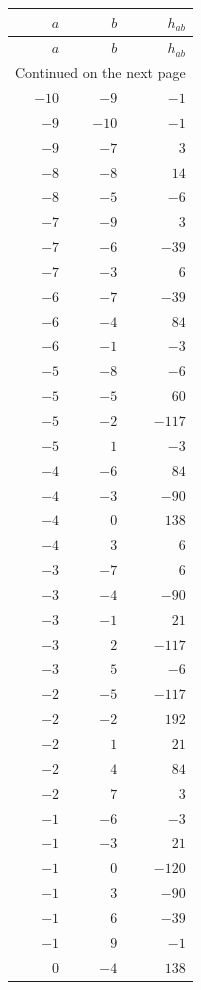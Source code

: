\begin{longtable}{rrr}
\toprule
$a$ & $b$ & $h_{ab}$ \\
\midrule
\endfirsthead
\toprule
$a$ & $b$ & $h_{ab}$ \\
\midrule
\endhead
\midrule
\multicolumn{3}{r}{Continued on the next page} \\
\endfoot
\bottomrule
\endlastfoot
$-10$ & $-9$ & $-1$ \\
$-9$ & $-10$ & $-1$ \\
$-9$ & $-7$ & $3$ \\
$-8$ & $-8$ & $14$ \\
$-8$ & $-5$ & $-6$ \\
$-7$ & $-9$ & $3$ \\
$-7$ & $-6$ & $-39$ \\
$-7$ & $-3$ & $6$ \\
$-6$ & $-7$ & $-39$ \\
$-6$ & $-4$ & $84$ \\
$-6$ & $-1$ & $-3$ \\
$-5$ & $-8$ & $-6$ \\
$-5$ & $-5$ & $60$ \\
$-5$ & $-2$ & $-117$ \\
$-5$ & $1$ & $-3$ \\
$-4$ & $-6$ & $84$ \\
$-4$ & $-3$ & $-90$ \\
$-4$ & $0$ & $138$ \\
$-4$ & $3$ & $6$ \\
$-3$ & $-7$ & $6$ \\
$-3$ & $-4$ & $-90$ \\
$-3$ & $-1$ & $21$ \\
$-3$ & $2$ & $-117$ \\
$-3$ & $5$ & $-6$ \\
$-2$ & $-5$ & $-117$ \\
$-2$ & $-2$ & $192$ \\
$-2$ & $1$ & $21$ \\
$-2$ & $4$ & $84$ \\
$-2$ & $7$ & $3$ \\
$-1$ & $-6$ & $-3$ \\
$-1$ & $-3$ & $21$ \\
$-1$ & $0$ & $-120$ \\
$-1$ & $3$ & $-90$ \\
$-1$ & $6$ & $-39$ \\
$-1$ & $9$ & $-1$ \\
$0$ & $-4$ & $138$ \\

\end{longtable}
